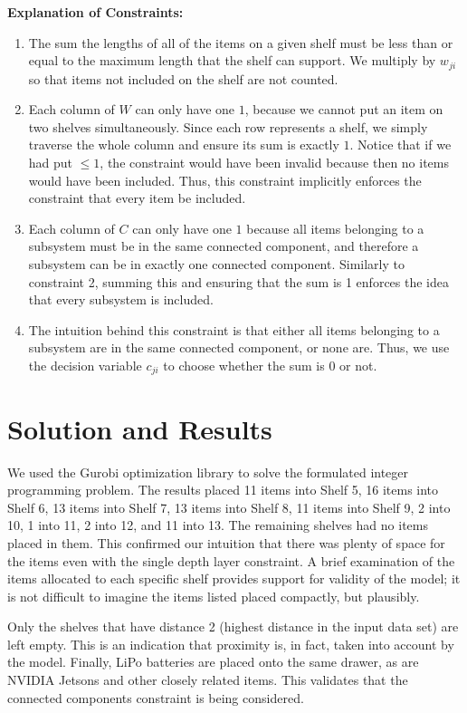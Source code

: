 \documentclass[10pt]{article}
\theoremstyle{named}
\begin{document}
\textbf{Explanation of Constraints:}
\begin{enumerate}
\item The sum the lengths of all of the items on a given shelf must be less than or equal to
  the maximum length that the shelf can support. We multiply by $w_{ji}$ so that
  items not included on the shelf are not counted.
\item Each column of $W$ can only have one $1$, because we cannot put an item
  on two shelves simultaneously. Since each row represents a shelf, we simply
  traverse the whole column and ensure its sum is exactly $1$. Notice that if
  we had put $\leq 1$, the constraint would have been invalid because then
  no items would have been included. Thus, this constraint implicitly enforces
  the constraint that every item be included.
\item Each column of $C$ can only have one $1$ because all items belonging to
  a subsystem must be in the same connected component, and therefore a subsystem
  can be in exactly one connected component. Similarly to constraint 2, summing
  this and ensuring that the sum is 1 enforces the idea that every subsystem is
  included.
\item The intuition behind this constraint is that either all items belonging
  to a subsystem are in the same connected component, or none are. Thus, we
  use the decision variable $c_{ji}$ to choose whether the sum is $0$ or not.
\end{enumerate}

\section{Solution and Results}
We used the Gurobi optimization library to solve the formulated integer programming
problem. The results placed 11 items into Shelf 5, 16 items into Shelf 6, 13 items
into Shelf 7, 13 items into Shelf 8, 11 items into Shelf 9, 2 into 10, 1 into 11,
2 into 12, and 11 into 13. The remaining shelves had no items placed in them.
This confirmed our intuition that there was plenty of space for the items
even with the single depth layer constraint. A brief examination of the items
allocated to each specific shelf provides support for validity of the model;
it is not difficult to imagine the items listed placed compactly, but plausibly.
\par
Only the shelves that have distance 2 (highest distance in the input data set)
are left empty. This is an indication that proximity is, in fact, taken into
account by the model. Finally, LiPo batteries are placed onto the same drawer,
as are NVIDIA Jetsons and other closely related items. This validates that the
connected components constraint is being considered.
\end{document}
